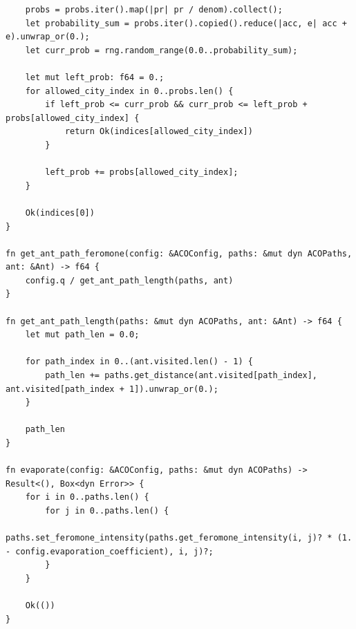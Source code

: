 \documentclass[a4paper,14pt]{extarticle}
\begin{document}
\begin{verbatim}
    probs = probs.iter().map(|pr| pr / denom).collect();
    let probability_sum = probs.iter().copied().reduce(|acc, e| acc + e).unwrap_or(0.);
    let curr_prob = rng.random_range(0.0..probability_sum);

    let mut left_prob: f64 = 0.;
    for allowed_city_index in 0..probs.len() {
        if left_prob <= curr_prob && curr_prob <= left_prob + probs[allowed_city_index] {
            return Ok(indices[allowed_city_index])
        }

        left_prob += probs[allowed_city_index];
    }

    Ok(indices[0])
}

fn get_ant_path_feromone(config: &ACOConfig, paths: &mut dyn ACOPaths, ant: &Ant) -> f64 {
    config.q / get_ant_path_length(paths, ant)
}

fn get_ant_path_length(paths: &mut dyn ACOPaths, ant: &Ant) -> f64 {
    let mut path_len = 0.0;
    
    for path_index in 0..(ant.visited.len() - 1) {
        path_len += paths.get_distance(ant.visited[path_index], ant.visited[path_index + 1]).unwrap_or(0.);
    }

    path_len
}

fn evaporate(config: &ACOConfig, paths: &mut dyn ACOPaths) -> Result<(), Box<dyn Error>> {
    for i in 0..paths.len() {
        for j in 0..paths.len() {
            paths.set_feromone_intensity(paths.get_feromone_intensity(i, j)? * (1. - config.evaporation_coefficient), i, j)?;
        }
    }

    Ok(())
}
\end{verbatim}
\end{document}
